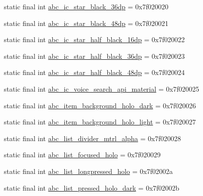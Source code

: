 \begin{CompactItemize}
\item 
static final int \hyperlink{classandroid_1_1support_1_1v7_1_1mediarouter_1_1_r_1_1drawable_3988bffe60a465d7dec0e08674c822d9}{abc\_\-ic\_\-star\_\-black\_\-36dp} = 0x7f020020
\item 
static final int \hyperlink{classandroid_1_1support_1_1v7_1_1mediarouter_1_1_r_1_1drawable_eed833d28931245547ace3314d59032b}{abc\_\-ic\_\-star\_\-black\_\-48dp} = 0x7f020021
\item 
static final int \hyperlink{classandroid_1_1support_1_1v7_1_1mediarouter_1_1_r_1_1drawable_cdde13b8910da7416d5e53eeab002cb4}{abc\_\-ic\_\-star\_\-half\_\-black\_\-16dp} = 0x7f020022
\item 
static final int \hyperlink{classandroid_1_1support_1_1v7_1_1mediarouter_1_1_r_1_1drawable_d5869f471775ab125400debcee043718}{abc\_\-ic\_\-star\_\-half\_\-black\_\-36dp} = 0x7f020023
\item 
static final int \hyperlink{classandroid_1_1support_1_1v7_1_1mediarouter_1_1_r_1_1drawable_433bbcaf81289629ee01f6230f29659d}{abc\_\-ic\_\-star\_\-half\_\-black\_\-48dp} = 0x7f020024
\item 
static final int \hyperlink{classandroid_1_1support_1_1v7_1_1mediarouter_1_1_r_1_1drawable_42bc1a90fbd1938906b6d7cb54a99c3c}{abc\_\-ic\_\-voice\_\-search\_\-api\_\-material} = 0x7f020025
\item 
static final int \hyperlink{classandroid_1_1support_1_1v7_1_1mediarouter_1_1_r_1_1drawable_39250e329d82baf782c6baf15088d181}{abc\_\-item\_\-background\_\-holo\_\-dark} = 0x7f020026
\item 
static final int \hyperlink{classandroid_1_1support_1_1v7_1_1mediarouter_1_1_r_1_1drawable_a453328e20eeaf8acb207099ce646f5b}{abc\_\-item\_\-background\_\-holo\_\-light} = 0x7f020027
\item 
static final int \hyperlink{classandroid_1_1support_1_1v7_1_1mediarouter_1_1_r_1_1drawable_e112d509285905b3904a6f97ea82ccfb}{abc\_\-list\_\-divider\_\-mtrl\_\-alpha} = 0x7f020028
\item 
static final int \hyperlink{classandroid_1_1support_1_1v7_1_1mediarouter_1_1_r_1_1drawable_3ebbedf600bdfa85edebe73bceb3a99f}{abc\_\-list\_\-focused\_\-holo} = 0x7f020029
\item 
static final int \hyperlink{classandroid_1_1support_1_1v7_1_1mediarouter_1_1_r_1_1drawable_3ae3e444908e377e650dbabad111014b}{abc\_\-list\_\-longpressed\_\-holo} = 0x7f02002a
\item 
static final int \hyperlink{classandroid_1_1support_1_1v7_1_1mediarouter_1_1_r_1_1drawable_3e0938d382af04c6013abb6f88da5f52}{abc\_\-list\_\-pressed\_\-holo\_\-dark} = 0x7f02002b

\end{CompactItemize}
